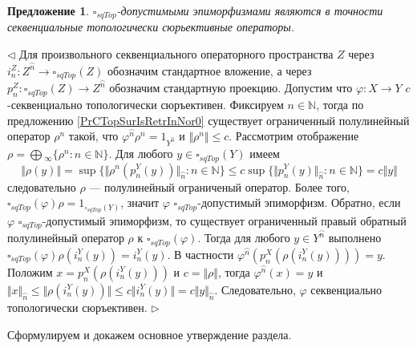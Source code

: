 \documentclass[12pt]{article}
\newtheorem{proposition}[theorem]{Предложение}
\newenvironment{proof}{\par $\triangleleft$}{$\triangleright$}
\begin{document}
\begin{proposition}\label{PrDecsTopAdmEpiMorph} $\square_{sqTop}$-допустимыми эпиморфизмами являются в точности секвенциальные топологически сюрьективные операторы.
\end{proposition}
\begin{proof}
Для произвольного секвенциального операторного пространства $Z$ через $i_n^Z:Z^{\wideparen{n}}\to\square_{sqTop}(Z)$ обозначим стандартное вложение, а через $p_n^Z:\square_{sqTop}(Z)\to Z^{\wideparen{n}}$ обозначим 
стандартную проекцию. Допустим что $\varphi:X\to Y$ $c$-секвенциально топологически сюръективен. Фиксируем $n\in\mathbb{N}$, тогда по предложению \ref{PrCTopSurIsRetrInNor0} существует ограниченный полулинейный оператор $\rho^n$ такой, что $\varphi^{\wideparen{n}}\rho^n=1_{Y^{\wideparen{n}}}$ и $\Vert\rho^n\Vert\leq c$. Рассмотрим отображение 
$ \rho=\bigoplus{}_\infty\{\rho^n:n\in\mathbb{N}\}$. Для любого $y\in \square_{sqTop}(Y)$ имеем 
$$
\Vert \rho(y)\Vert=\sup\{\Vert\rho^n(p_n^Y(y))\Vert_{\wideparen{n}}: n\in\mathbb{N}\}\leq
c\sup\{\Vert p_n^Y(y)\Vert_{\wideparen{n}}: n\in\mathbb{N}\}=c\Vert y\Vert
$$
следовательно $\rho$ --- полулинейный ограниченый оператор. Более того, $\square_{sqTop}(\varphi)\rho=1_{\square_{sqTop}(Y)}$, значит $\varphi$ $\square_{sqTop}$-допустимый эпиморфизм. Обратно, если 
$\varphi$ $\square_{sqTop}$-допустимый эпиморфизм, то существует ограниченный правый обратный полулинейный оператор  $\rho$ к $\square_{sqTop}(\varphi)$. Тогда для 
любого $y\in Y^{\wideparen{n}}$ выполнено $\square_{sqTop}(\varphi)\rho(i_n^Y(y))=i_n^Y(y)$. В частности $\varphi^{\wideparen{n}}(p_n^X(\rho(i_n^Y(y))))=y$. Положим $x=p_n^X(\rho(i_n^Y(y)))$ и 
$c=\Vert\rho\Vert$, тогда $\varphi^{\wideparen{n}}(x)=y$ и $\Vert x\Vert_{\wideparen{n}}\leq\Vert\rho(i_n^Y(y))\Vert\leq c\Vert i_n^Y(y)\Vert=c\Vert y\Vert_{\wideparen{n}}$. Следовательно, 
$\varphi$  секвенциально топологически сюръективен.
\end{proof}

Сформулируем и докажем основное утверждение раздела.
\end{document}
